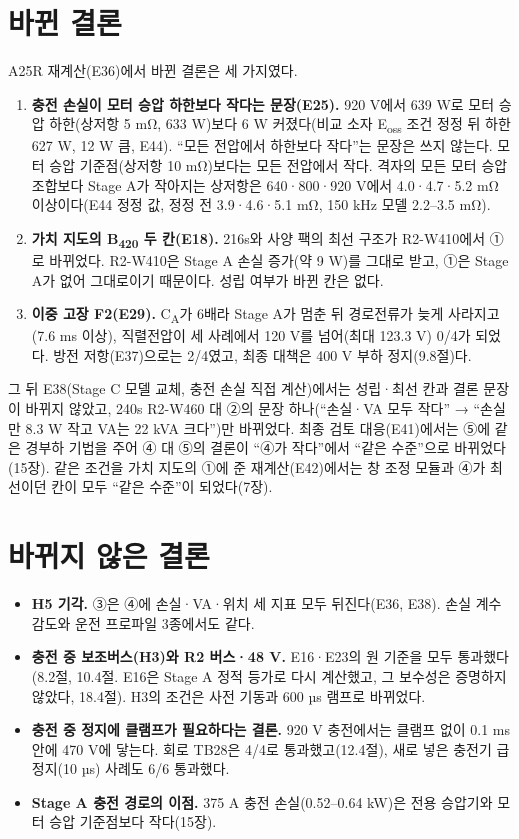 \section{바뀐 결론}

A25R 재계산(E36)에서 바뀐 결론은 세 가지였다.

\begin{enumerate}[label=(\arabic*)]
\item \textbf{충전 손실이 모터 승압 하한보다 작다는 문장(E25).} 920 V에서 639 W로 모터 승압 하한(상저항 5 mΩ, 633 W)보다 6 W 커졌다(비교 소자 E\textsubscript{oss} 조건 정정 뒤 하한 627 W, 12 W 큼, E44). “모든 전압에서 하한보다 작다”는 문장은 쓰지 않는다. 모터 승압 기준점(상저항 10 mΩ)보다는 모든 전압에서 작다. 격자의 모든 모터 승압 조합보다 Stage A가 작아지는 상저항은 640·800·920 V에서 4.0·4.7·5.2 mΩ 이상이다(E44 정정 값, 정정 전 3.9·4.6·5.1 mΩ, 150 kHz 모델 2.2–3.5 mΩ).
\item \textbf{가치 지도의 B\textsubscript{420} 두 칸(E18).} 216s와 사양 팩의 최선 구조가 R2-W410에서 ①로 바뀌었다. R2-W410은 Stage A 손실 증가(약 9 W)를 그대로 받고, ①은 Stage A가 없어 그대로이기 때문이다. 성립 여부가 바뀐 칸은 없다.
\item \textbf{이중 고장 F2(E29).} C\textsubscript{A}가 6배라 Stage A가 멈춘 뒤 경로전류가 늦게 사라지고(7.6 ms 이상), 직렬전압이 세 사례에서 120 V를 넘어(최대 123.3 V) 0/4가 되었다. 방전 저항(E37)으로는 2/4였고, 최종 대책은 400 V 부하 정지(9.8절)다.
\end{enumerate}

그 뒤 E38(Stage C 모델 교체, 충전 손실 직접 계산)에서는 성립·최선 칸과 결론 문장이 바뀌지 않았고, 240s R2-W460 대 ②의 문장 하나(“손실·VA 모두 작다” → “손실만 8.3 W 작고 VA는 22 kVA 크다”)만 바뀌었다. 최종 검토 대응(E41)에서는 ⑤에 같은 경부하 기법을 주어 ④ 대 ⑤의 결론이 “④가 작다”에서 “같은 수준”으로 바뀌었다(15장). 같은 조건을 가치 지도의 ①에 준 재계산(E42)에서는 창 조정 모듈과 ④가 최선이던 칸이 모두 “같은 수준”이 되었다(7장).

\section{바뀌지 않은 결론}

\begin{itemize}
\item \textbf{H5 기각.} ③은 ④에 손실·VA·위치 세 지표 모두 뒤진다(E36, E38). 손실 계수 감도와 운전 프로파일 3종에서도 같다.
\item \textbf{충전 중 보조버스(H3)와 R2 버스·48 V.} E16·E23의 원 기준을 모두 통과했다(8.2절, 10.4절. E16은 Stage A 정적 등가로 다시 계산했고, 그 보수성은 증명하지 않았다, 18.4절). H3의 조건은 사전 기동과 600 µs 램프로 바뀌었다.
\item \textbf{충전 중 정지에 클램프가 필요하다는 결론.} 920 V 충전에서는 클램프 없이 0.1 ms 안에 470 V에 닿는다. 회로 TB28은 4/4로 통과했고(12.4절), 새로 넣은 충전기 급정지(10 µs) 사례도 6/6 통과했다.
\item \textbf{Stage A 충전 경로의 이점.} 375 A 충전 손실(0.52–0.64 kW)은 전용 승압기와 모터 승압 기준점보다 작다(15장).
\end{itemize}
